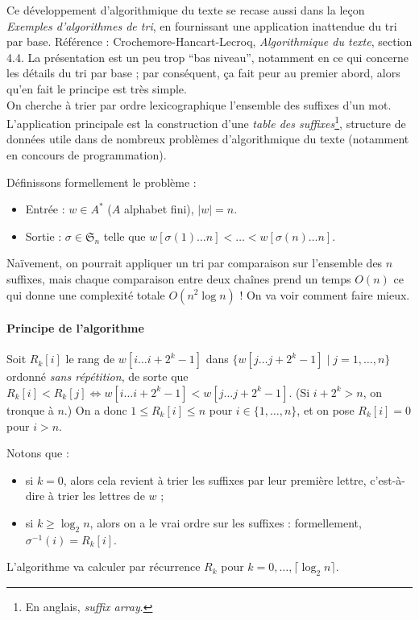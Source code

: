 \documentclass[a4paper, 11pt]{article}
\def\Sigmap{\mathfrak{S}}
\begin{document}
Ce développement d'algorithmique du texte se recase aussi dans la leçon
\emph{Exemples d'algorithmes de tri}, en fournissant une application inattendue
du tri par base. Référence : Crochemore-Hancart-Lecroq, \emph{Algorithmique du
  texte}, section 4.4. La présentation est un peu trop \enquote{bas niveau},
notamment en ce qui concerne les détails du tri par base ; par conséquent, ça
fait peur au premier abord, alors qu'en fait le principe est très simple.\\

On cherche à trier par ordre lexicographique l'ensemble des suffixes d'un mot.
L'application principale est la construction d'une \emph{table des
  suffixes}\footnote{En anglais, \emph{suffix array}.}, structure de données
utile dans de nombreux problèmes d'algorithmique du texte (notamment en concours
de programmation).

Définissons formellement le problème :
\begin{itemize}
\item Entrée : $w \in A^*$ ($A$ alphabet fini), $|w| = n$.
\item Sortie : $\sigma \in \Sigmap_n$ telle que $w[\sigma(1) \ldots n] < \ldots
  < w[\sigma(n) \ldots n]$.
\end{itemize}

Naïvement, on pourrait appliquer un tri par comparaison sur l'ensemble des $n$
suffixes, mais chaque comparaison entre deux chaînes prend un temps $O(n)$ ce
qui donne une complexité totale $O(n^2 \log n)$ ! On va voir comment faire
mieux.

\paragraph{Principe de l'algorithme}

Soit $R_k[i]$ le rang de $w[i \ldots i + 2^k - 1]$ dans $\{ w[j \ldots j + 2^k -
1] \mid j = 1, \ldots, n \}$ ordonné \emph{sans répétition}, de sorte que
$R_k[i] < R_k[j] \Leftrightarrow w[i \ldots i + 2^k - 1] < w[j \ldots j + 2^k -
1]$. (Si $i + 2^k > n$, on tronque à $n$.) On a donc $1 \leq R_k[i] \leq n$ pour
$i \in \{1, \ldots, n\}$, et on pose $R_k[i] = 0$ pour $i > n$.

Notons que :
\begin{itemize}
\item si $k = 0$, alors cela revient à trier les suffixes par leur première
  lettre, c'est-à-dire à trier les lettres de $w$ ;
\item si $k \geq \log_2 n$, alors on a le vrai ordre sur les suffixes :
  formellement, $\sigma^{-1}(i) = R_k[i]$.
\end{itemize}
L'algorithme va calculer par récurrence $R_k$ pour $k = 0, \ldots, \lceil
\log_2 n \rceil$.
\end{document}
